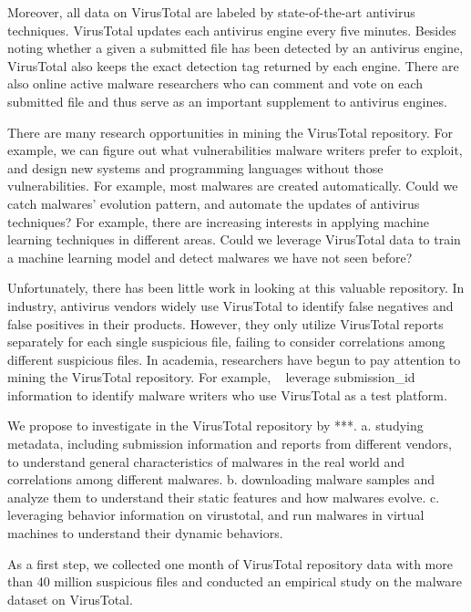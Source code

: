 Moreover, all data on VirusTotal are labeled by state-of-the-art antivirus techniques. 
VirusTotal updates each antivirus engine every five minutes. 
Besides noting whether a given a submitted file has been detected by an antivirus engine, 
VirusTotal also keeps the exact detection tag returned by each engine. 
There are also online active malware researchers 
who can comment and vote on each submitted file 
and thus serve as an important supplement to antivirus engines. 

There are many research opportunities in mining the VirusTotal repository. 
For example, we can figure out what vulnerabilities malware writers prefer to exploit, 
and design new systems and programming languages without those vulnerabilities. 
For example, most malwares are created automatically. 
Could we catch malwares' evolution pattern, and automate the updates of antivirus techniques?
For example, there are increasing interests in applying machine learning techniques in different areas. 
Could we leverage VirusTotal data to train a machine learning model and detect malwares we have not seen before? 

Unfortunately, there has been little work in looking at this valuable repository.
In industry, antivirus vendors widely use VirusTotal to identify false negatives 
and false positives in their products. 
However, they only utilize VirusTotal reports separately for each single suspicious file, 
failing to consider correlations among different suspicious files. 
In academia, researchers have begun to pay attention to mining the VirusTotal repository. 
For example, ~\citet{neeles} leverage submission\_id information to identify malware writers 
who use VirusTotal as a test platform. 

We propose to investigate in the VirusTotal repository by ***.
a. studying metadata, including submission information and reports from different vendors, 
to understand general characteristics of malwares in the real world and correlations among different malwares. 
b. downloading malware samples and analyze them to understand their static features and how malwares evolve. 
c. leveraging behavior information on virustotal, and run malwares in virtual machines to understand their dynamic behaviors. 

As a first step, we collected one month of VirusTotal repository data with more than 40 million suspicious files
and conducted an empirical study on the malware dataset on VirusTotal. 

